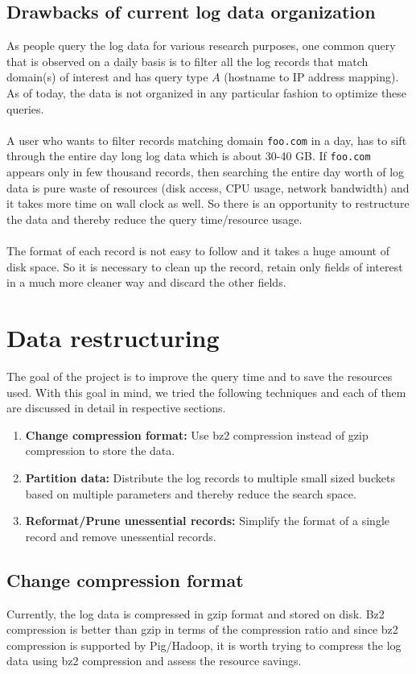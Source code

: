\documentclass[11pt,a4paper]{article}
\newcommand{\resitem}[1]{\item #1 \vspace{-7pt}}
\begin{document}
\subsection{Drawbacks of current log data organization}
As people query the log data for various research purposes, one common query that is observed on a daily basis is to filter all the log records that match domain(s) of interest and has query type $A$ (hostname to IP address mapping). As of today, the data is not organized in any particular fashion to optimize these queries.
\\\\
A user who wants to filter records matching domain \texttt{foo.com} in a day, has to sift through the entire day long log data which is about 30-40 GB. If \texttt{foo.com} appears only in few thousand records, then searching the entire day worth of log data is pure waste of resources (disk access, CPU usage, network bandwidth) and it takes more time on wall clock as well. So there is an opportunity to restructure the data and thereby reduce the query time/resource usage.
\\\\
The format of each record is not easy to follow and it takes a huge amount of disk space. So it is necessary to clean up the record, retain only fields of interest in a much more cleaner way and discard the other fields.

\section {Data restructuring}
The goal of the project is to improve the query time and to save the resources used. With this goal in mind, we tried the following techniques and each of them are discussed in detail in respective sections.
\begin{enumerate}

	\resitem {\textbf{Change compression format:} Use bz2 compression instead of gzip compression to store the data.}    \resitem {\textbf{Partition data:} Distribute the log records to multiple small sized buckets based on multiple parameters and thereby reduce the search space.}
    \resitem {\textbf{Reformat/Prune unessential records:} Simplify the format of a single record and remove unessential records.}
\end{enumerate}

\subsection{Change compression format}
Currently, the log data is compressed in gzip format and stored on disk. Bz2 compression is better than gzip in terms of the compression ratio and since bz2 compression is supported by Pig/Hadoop, it is worth trying to compress the log data using bz2 compression and assess the resource savings.
\end{document}
